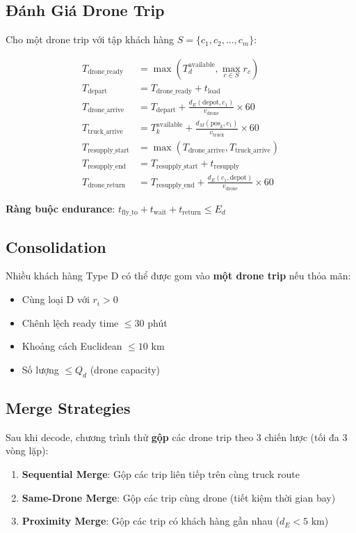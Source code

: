 \documentclass[12pt,a4paper]{article}
\begin{document}
\subsection{Đánh Giá Drone Trip}

Cho một drone trip với tập khách hàng $S = \{c_1, c_2, \ldots, c_m\}$:

\begin{align}
    T_{\text{drone\_ready}} &= \max\left(T_d^{\text{available}}, \max_{c \in S} r_c\right) \\
    T_{\text{depart}} &= T_{\text{drone\_ready}} + t_{\text{load}} \\
    T_{\text{drone\_arrive}} &= T_{\text{depart}} + \frac{d_E(\text{depot}, c_1)}{v_{\text{drone}}} \times 60 \\
    T_{\text{truck\_arrive}} &= T_k^{\text{available}} + \frac{d_M(\text{pos}_k, c_1)}{v_{\text{truck}}} \times 60 \\
    T_{\text{resupply\_start}} &= \max(T_{\text{drone\_arrive}}, T_{\text{truck\_arrive}}) \\
    T_{\text{resupply\_end}} &= T_{\text{resupply\_start}} + t_{\text{resupply}} \\
    T_{\text{drone\_return}} &= T_{\text{resupply\_end}} + \frac{d_E(c_1, \text{depot})}{v_{\text{drone}}} \times 60
\end{align}

\textbf{Ràng buộc endurance}: $t_{\text{fly\_to}} + t_{\text{wait}} + t_{\text{return}} \leq E_d$

\subsection{Consolidation}

Nhiều khách hàng Type D có thể được gom vào \textbf{một drone trip} nếu thỏa mãn:
\begin{itemize}[nosep]
    \item Cùng loại D với $r_i > 0$
    \item Chênh lệch ready time $\leq 30$ phút
    \item Khoảng cách Euclidean $\leq 10$ km
    \item Số lượng $\leq Q_d$ (drone capacity)
\end{itemize}

\subsection{Merge Strategies}

Sau khi decode, chương trình thử \textbf{gộp} các drone trip theo 3 chiến lược (tối đa 3 vòng lặp):
\begin{enumerate}[nosep]
    \item \textbf{Sequential Merge}: Gộp các trip liên tiếp trên cùng truck route
    \item \textbf{Same-Drone Merge}: Gộp các trip cùng drone (tiết kiệm thời gian bay)
    \item \textbf{Proximity Merge}: Gộp các trip có khách hàng gần nhau ($d_E < 5$ km)
\end{enumerate}
\end{document}
